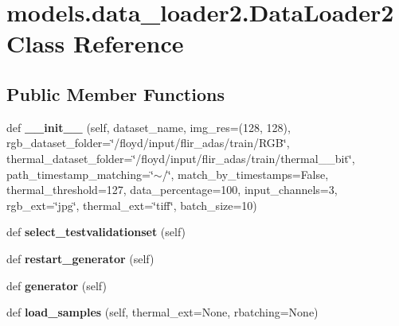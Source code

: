 \hypertarget{classmodels_1_1data__loader2_1_1DataLoader2}{}\section{models.\+data\+\_\+loader2.\+Data\+Loader2 Class Reference}
\label{classmodels_1_1data__loader2_1_1DataLoader2}
\subsection*{Public Member Functions}
\begin{DoxyCompactItemize}
\item 
\mbox{\label{classmodels_1_1data__loader2_1_1DataLoader2_ab6e70d804efa9fbd84690338bfbd655c}} 
def {\bfseries \+\_\+\+\_\+init\+\_\+\+\_\+} (self, dataset\+\_\+name, img\+\_\+res=(128, 128), rgb\+\_\+dataset\+\_\+folder=\char`\"{}/floyd/input/flir\+\_\+adas/train/R\+GB\char`\"{}, thermal\+\_\+dataset\+\_\+folder=\char`\"{}/floyd/input/flir\+\_\+adas/train/thermal\+\_\+\_\+bit\char`\"{}, path\+\_\+timestamp\+\_\+matching=\char`\"{}$\sim$/\char`\"{}, match\+\_\+by\+\_\+timestamps=False, thermal\+\_\+threshold=127, data\+\_\+percentage=100, input\+\_\+channels=3, rgb\+\_\+ext=\char`\"{}jpg\char`\"{}, thermal\+\_\+ext=\char`\"{}tiff\char`\"{}, batch\+\_\+size=10)
\item 
\mbox{\label{classmodels_1_1data__loader2_1_1DataLoader2_aeb1d7d8f02f742c7b34cd8c152399503}} 
def {\bfseries select\+\_\+testvalidationset} (self)
\item 
\mbox{\label{classmodels_1_1data__loader2_1_1DataLoader2_a7a2c45e56f9fa5f36cea5e4c0e1a9b60}} 
def {\bfseries restart\+\_\+generator} (self)
\item 
\mbox{\label{classmodels_1_1data__loader2_1_1DataLoader2_ac75cad5c82fff20b5557d6beac4df51e}} 
def {\bfseries generator} (self)
\item 
\mbox{\label{classmodels_1_1data__loader2_1_1DataLoader2_a68579a2ba7674b71e77ff5604e7c035e}} 
def {\bfseries load\+\_\+samples} (self, thermal\+\_\+ext=None, rbatching=None)

\end{DoxyCompactItemize}
